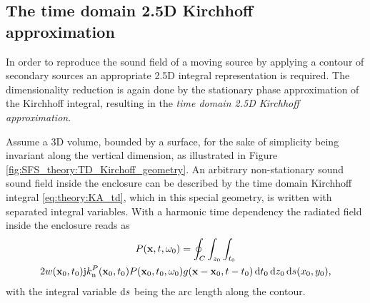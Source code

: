 \subsection{The time domain 2.5D Kirchhoff approximation}

In order to reproduce the sound field of a moving source by applying a contour of secondary sources an appropriate 2.5D integral representation is required.
The dimensionality reduction is again done by the stationary phase approximation of the Kirchhoff integral, resulting in the \emph{time domain 2.5D Kirchhoff approximation}.

Assume a 3D volume, bounded by a surface, for the sake of simplicity being invariant along the vertical dimension, as illustrated in Figure \ref{fig:SFS_theory:TD_Kirchoff_geometry}.
An arbitrary non-stationary sound sound field inside the enclosure can be described by the time domain Kirchhoff integral \eqref{eq:theory:KA_td}, which in this special geometry, is written with separated integral variables.
With a harmonic time dependency the radiated field inside the enclosure reads as
\begin{multline}
\displaystyle
P(\mathbf{x},t,\omega_0) = 
\oint_{C} \int_{z_0} \int_{t_0} \\
2 w(\mathbf{x}_0,t_0) \mathrm{j} k_{\mathrm{n}}^P(\mathbf{x}_0,t_0) 	
P(\mathbf{x}_0,t_0,\omega_0) g(\mathbf{x}-\mathbf{x}_0,t-t_0) \, \mathrm{d} t_0 \, \mathrm{d} z_0 \, \mathrm{d} s(x_0, y_0),
\label{Eq:SFS_theory:Kirchhoff_spec_geom_td}
\end{multline}
with the integral variable $\mathrm{d} s$ being the arc length along the contour.
%


